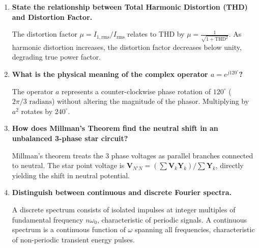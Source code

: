 \documentclass[12pt,a4paper]{article}
\newcommand{\Q}[1]{\textbf{#1}\par\noindent\ignorespaces}
\begin{document}
\begin{tcolorbox}[exambox, title={\textbf{Frequently Asked / Viva Questions}}]
\begin{enumerate}[topsep=0pt, label=\textbf{Q\arabic*.}, itemsep=5pt]
  \item \Q{State the relationship between Total Harmonic Distortion (THD) and Distortion Factor.}
  The distortion factor $\mu = I_{1,\text{rms}} / I_{\text{rms}}$ relates to THD by $\mu = \frac{1}{\sqrt{1 + \text{THD}^2}}$. As harmonic distortion increases, the distortion factor decreases below unity, degrading true power factor.

  \item \Q{What is the physical meaning of the complex operator $a = e^{j 120^\circ}$?}
  The operator $a$ represents a counter-clockwise phase rotation of $120^\circ$ ($2\pi/3\text{ radians}$) without altering the magnitude of the phasor. Multiplying by $a^2$ rotates by $240^\circ$.

  \item \Q{How does Millman's Theorem find the neutral shift in an unbalanced 3-phase star circuit?}
  Millman's theorem treats the 3 phase voltages as parallel branches connected to neutral. The star point voltage is $\mathbf{V}_{N'N} = (\sum \mathbf{V}_k \mathbf{Y}_k) / \sum \mathbf{Y}_k$, directly yielding the shift in neutral potential.

  \item \Q{Distinguish between continuous and discrete Fourier spectra.}
  A discrete spectrum consists of isolated impulses at integer multiples of fundamental frequency $n\omega_0$, characteristic of periodic signals. A continuous spectrum is a continuous function of $\omega$ spanning all frequencies, characteristic of non-periodic transient energy pulses.
\end{enumerate}
\end{tcolorbox}
\end{document}
